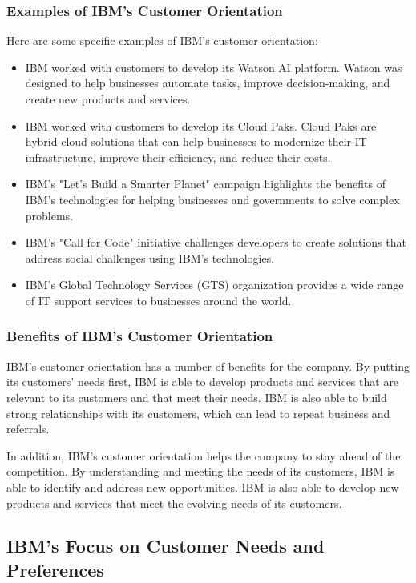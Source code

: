 \subsubsection{Examples of IBM's Customer Orientation}

Here are some specific examples of IBM's customer orientation:

\begin{itemize}
  \item IBM worked with customers to develop its Watson AI platform. Watson was designed to help businesses automate tasks, improve decision-making, and create new products and services.
  \item IBM worked with customers to develop its Cloud Paks. Cloud Paks are hybrid cloud solutions that can help businesses to modernize their IT infrastructure, improve their efficiency, and reduce their costs.
  \item IBM's "Let's Build a Smarter Planet" campaign highlights the benefits of IBM's technologies for helping businesses and governments to solve complex problems.
  \item IBM's "Call for Code" initiative challenges developers to create solutions that address social challenges using IBM's technologies.
  \item IBM's Global Technology Services (GTS) organization provides a wide range of IT support services to businesses around the world.
\end{itemize}

\subsubsection{Benefits of IBM's Customer Orientation}

IBM's customer orientation has a number of benefits for the company. By putting its customers' needs first, IBM is able to develop products and services that are relevant to its customers and that meet their needs. IBM is also able to build strong relationships with its customers, which can lead to repeat business and referrals.

In addition, IBM's customer orientation helps the company to stay ahead of the competition. By understanding and meeting the needs of its customers, IBM is able to identify and address new opportunities. IBM is also able to develop new products and services that meet the evolving needs of its customers.

\subsection{IBM's Focus on Customer Needs and Preferences}

